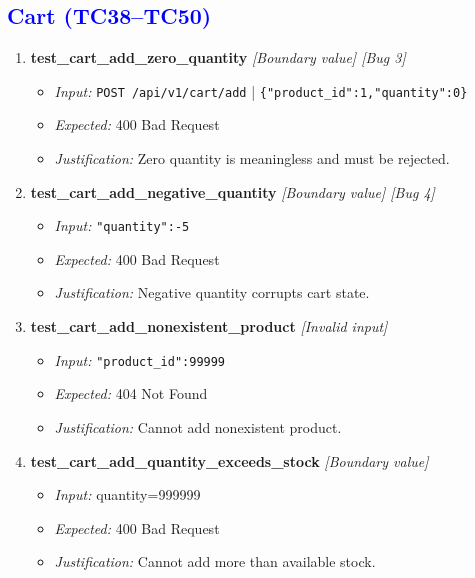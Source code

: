 \documentclass{article}
\begin{document}
\subsection*{\textcolor{blue}{Cart (TC38--TC50)}}
\begin{enumerate}[resume, label=\textbf{TC\arabic*.}]

\item \textbf{test\_cart\_add\_zero\_quantity} \textit{[Boundary value] \textit{[Bug 3]}}
\begin{itemize}[noitemsep]
  \item \textit{Input:} \texttt{POST /api/v1/cart/add} | \texttt{\{"product\_id":1,"quantity":0\}}
  \item \textit{Expected:} 400 Bad Request
  \item \textit{Justification:} Zero quantity is meaningless and must be rejected.
\end{itemize}

\item \textbf{test\_cart\_add\_negative\_quantity} \textit{[Boundary value] \textit{[Bug 4]}}
\begin{itemize}[noitemsep]
  \item \textit{Input:} \texttt{"quantity":-5}
  \item \textit{Expected:} 400 Bad Request
  \item \textit{Justification:} Negative quantity corrupts cart state.
\end{itemize}

\item \textbf{test\_cart\_add\_nonexistent\_product} \textit{[Invalid input]}
\begin{itemize}[noitemsep]
  \item \textit{Input:} \texttt{"product\_id":99999}
  \item \textit{Expected:} 404 Not Found
  \item \textit{Justification:} Cannot add nonexistent product.
\end{itemize}

\item \textbf{test\_cart\_add\_quantity\_exceeds\_stock} \textit{[Boundary value]}
\begin{itemize}[noitemsep]
  \item \textit{Input:} quantity=999999
  \item \textit{Expected:} 400 Bad Request
  \item \textit{Justification:} Cannot add more than available stock.
\end{itemize}


\end{enumerate}
\end{document}
